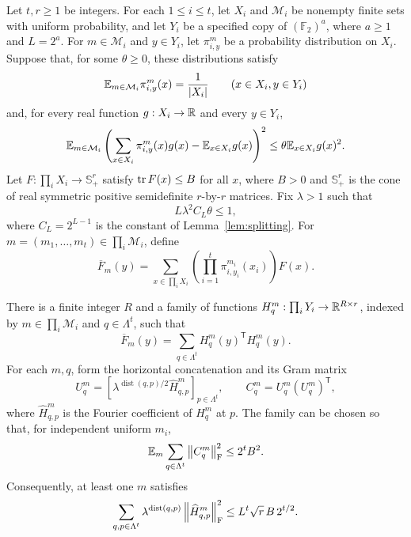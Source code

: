 \begin{theorem}
\label{thm:fourier-smoothing}
Let $t,r\ge1$ be integers.  For each $1\le i\le t$, let $X_i$ and
$\mathcal M_i$ be nonempty finite sets with uniform probability, and
let $Y_i$ be a specified copy of $(\mathbb F_2)^a$, where $a\ge1$ and
$L=2^a$.  For $m\in\mathcal M_i$ and $y\in Y_i$, let
$\pi_{i,y}^m$ be a probability distribution on $X_i$.
Suppose that, for some $\theta\ge0$, these distributions satisfy
\begin{equation}\label{eq:channel-marginal}
  \mathbb E_{m\in\mathcal M_i}\pi_{i,y}^m(x)=\frac1{|X_i|}
  \qquad(x\in X_i, y\in Y_i)
\end{equation}
and, for every real function $g:X_i\to\mathbb R$ and every $y\in Y_i$,
\begin{equation}\label{eq:channel-variance}
  \mathbb E_{m\in\mathcal M_i}
  \left(\sum_{x\in X_i}\pi_{i,y}^m(x)g(x)-\mathbb E_{x\in X_i}g(x)\right)^2
  \le\theta\mathbb E_{x\in X_i}g(x)^2.
\end{equation}
Let $F:\prod_iX_i\to\mathbb S_+^r$ satisfy $\operatorname{tr} F(x)\le B$ for all
$x$, where $B>0$ and $\mathbb S_+^r$ is the cone of real symmetric
positive semidefinite $r$-by-$r$ matrices.  Fix $\lambda>1$ such that
\begin{equation}\label{eq:smoothing-parameter}
  L\lambda^2C_L\theta\le1,
\end{equation}
where $C_L=2^{L-1}$ is the constant of Lemma~\ref{lem:splitting}.
For $m=(m_1,\ldots,m_t)\in\prod_i\mathcal M_i$, define
\begin{equation}\label{eq:product-average}
  \overline F_m(y)
  =\sum_{x\in\prod_iX_i}
     \left(\prod_{i=1}^t\pi_{i,y_i}^{m_i}(x_i)\right)F(x).
\end{equation}

There is a finite integer $R$ and a family of functions
$H_q^m:\prod_iY_i\to\mathbb R^{R\times r}$, indexed by
$m\in\prod_i\mathcal M_i$ and $q\in\Lambda^t$, such that
\begin{equation}\label{eq:smoothing-squares}
  \overline F_m(y)=\sum_{q\in\Lambda^t}H_q^m(y)^{\mathsf T}H_q^m(y).
\end{equation}
For each $m,q$, form the horizontal concatenation and its Gram matrix
\begin{equation}\label{eq:smoothing-gram}
  U_q^m=
    \left[\lambda^{\operatorname{dist}(q,p)/2}
           \widehat H_{q,p}^m\right]_{p\in\Lambda^t},
  \qquad C_q^m=U_q^m(U_q^m)^{\mathsf T},
\end{equation}
where $\widehat H_{q,p}^m$ is the Fourier coefficient of $H_q^m$ at $p$.
The family can be chosen so that, for independent uniform $m_i$,
\begin{equation}\label{eq:smoothing-potential}
  \mathbb E_m\sum_{q\in\Lambda^t}\left\lVert C_q^m\right\rVert_{\mathrm F}^2\le2^tB^2.
\end{equation}
Consequently, at least one $m$ satisfies
\begin{equation}\label{eq:smoothing-coefficients}
  \sum_{q,p\in\Lambda^t}
    \lambda^{\operatorname{dist}(q,p)}\left\lVert\widehat H_{q,p}^m\right\rVert_{\mathrm F}^2
  \le L^t\sqrt r\,B\,2^{t/2}.
\end{equation}
\end{theorem}

